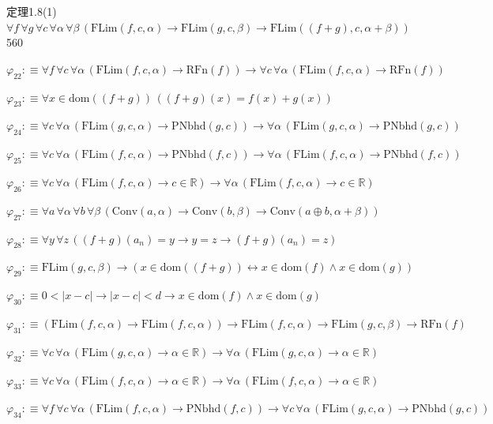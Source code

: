 \begin{fullproof}{定理1.8(1)}{$\forall f\,\forall g\,\forall c\,\forall \alpha\,\forall \beta\,(\mathrm{FLim}(f,c,\alpha) \to \mathrm{FLim}(g,c,\beta) \to \mathrm{FLim}((f + g),c,\alpha + \beta))$}{560}
\begin{abbrevlist}
\item $\varphi_{22} :\equiv \forall f\,\forall c\,\forall \alpha\,(\mathrm{FLim}(f,c,\alpha) \to \mathrm{RFn}(f)) \to \forall c\,\forall \alpha\,(\mathrm{FLim}(f,c,\alpha) \to \mathrm{RFn}(f))$
\item $\varphi_{23} :\equiv \forall x \in \mathrm{dom}((f + g))\,((f + g)(x) = f(x) + g(x))$
\item $\varphi_{24} :\equiv \forall c\,\forall \alpha\,(\mathrm{FLim}(g,c,\alpha) \to \mathrm{PNbhd}(g,c)) \to \forall \alpha\,(\mathrm{FLim}(g,c,\alpha) \to \mathrm{PNbhd}(g,c))$
\item $\varphi_{25} :\equiv \forall c\,\forall \alpha\,(\mathrm{FLim}(f,c,\alpha) \to \mathrm{PNbhd}(f,c)) \to \forall \alpha\,(\mathrm{FLim}(f,c,\alpha) \to \mathrm{PNbhd}(f,c))$
\item $\varphi_{26} :\equiv \forall c\,\forall \alpha\,(\mathrm{FLim}(f,c,\alpha) \to c \in \mathbb{R}) \to \forall \alpha\,(\mathrm{FLim}(f,c,\alpha) \to c \in \mathbb{R})$
\item $\varphi_{27} :\equiv \forall a\,\forall \alpha\,\forall b\,\forall \beta\,(\mathrm{Conv}(a,\alpha) \to \mathrm{Conv}(b,\beta) \to \mathrm{Conv}(a \oplus b,\alpha + \beta))$
\item $\varphi_{28} :\equiv \forall y\,\forall z\,((f + g)(a_{n}) = y \to y = z \to (f + g)(a_{n}) = z)$
\item $\varphi_{29} :\equiv \mathrm{FLim}(g,c,\beta) \to (x \in \mathrm{dom}((f + g)) \leftrightarrow x \in \mathrm{dom}(f) \land x \in \mathrm{dom}(g))$
\item $\varphi_{30} :\equiv 0 < \lvert x - c \rvert \to \lvert x - c \rvert < d \to x \in \mathrm{dom}(f) \land x \in \mathrm{dom}(g)$
\item $\varphi_{31} :\equiv (\mathrm{FLim}(f,c,\alpha) \to \mathrm{FLim}(f,c,\alpha)) \to \mathrm{FLim}(f,c,\alpha) \to \mathrm{FLim}(g,c,\beta) \to \mathrm{RFn}(f)$
\item $\varphi_{32} :\equiv \forall c\,\forall \alpha\,(\mathrm{FLim}(g,c,\alpha) \to \alpha \in \mathbb{R}) \to \forall \alpha\,(\mathrm{FLim}(g,c,\alpha) \to \alpha \in \mathbb{R})$
\item $\varphi_{33} :\equiv \forall c\,\forall \alpha\,(\mathrm{FLim}(f,c,\alpha) \to \alpha \in \mathbb{R}) \to \forall \alpha\,(\mathrm{FLim}(f,c,\alpha) \to \alpha \in \mathbb{R})$
\item $\varphi_{34} :\equiv \forall f\,\forall c\,\forall \alpha\,(\mathrm{FLim}(f,c,\alpha) \to \mathrm{PNbhd}(f,c)) \to \forall c\,\forall \alpha\,(\mathrm{FLim}(g,c,\alpha) \to \mathrm{PNbhd}(g,c))$

\end{abbrevlist}
\end{fullproof}

